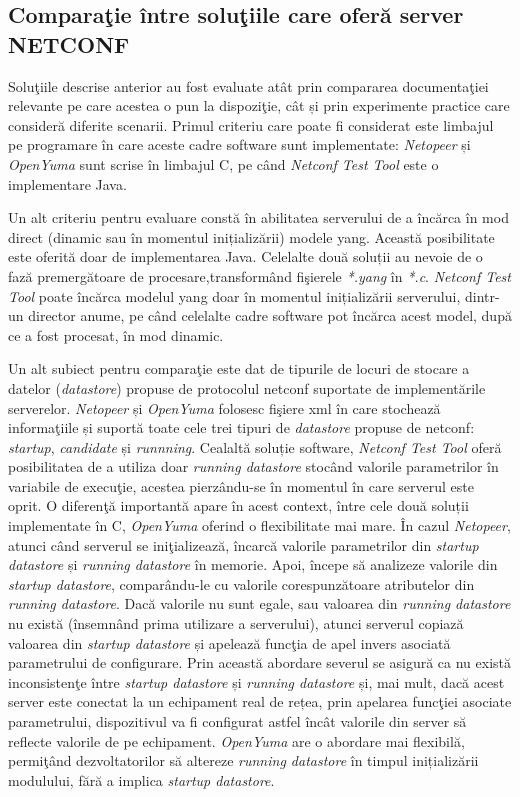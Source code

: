\subsection{Comparaţie între soluţiile care oferă server NETCONF}

Soluţiile descrise anterior au fost evaluate atât prin compararea documentaţiei relevante pe care acestea o pun la dispoziţie, cât și prin experimente practice care consideră diferite scenarii. Primul criteriu care poate fi considerat este limbajul pe programare în care aceste cadre software sunt implementate: \textit{Netopeer} și \textit{OpenYuma} sunt scrise în limbajul C, pe când \textit{Netconf Test Tool} este o implementare Java.

Un alt criteriu pentru evaluare constă în abilitatea serverului de a încărca în mod direct (dinamic sau în momentul inițializării) modele \gls{yang}. Această posibilitate este oferită doar de implementarea Java. Celelalte două soluții au nevoie de o fază premergătoare de procesare,transformând fişierele \textit{*.yang} în \textit{*.c}. \textit{Netconf Test Tool} poate încărca modelul \gls{yang} doar în momentul inițializării serverului, dintr-un director anume, pe când celelalte cadre software pot încărca acest model, după ce a fost procesat, în mod dinamic.

Un alt subiect pentru comparaţie este dat de tipurile de locuri de stocare a datelor (\textit{datastore}) propuse de protocolul \gls{netconf} suportate de implementările serverelor. \textit{Netopeer} și \textit{OpenYuma} folosesc fişiere \gls{xml} în care stochează informaţiile și suportă toate cele trei tipuri de \textit{datastore} propuse de \gls{netconf}: \textit{startup}, \textit{candidate} și \textit{runnning}. Cealaltă soluție software, \textit{Netconf Test Tool} oferă posibilitatea de a utiliza doar \textit{running datastore} stocând valorile parametrilor în variabile de execuţie, acestea pierzându-se în momentul în care serverul este oprit. O diferenţă importantă apare în acest context, între cele două soluții implementate în C, \textit{OpenYuma} oferind o flexibilitate mai mare. În cazul \textit{Netopeer}, atunci când serverul se iniţializează, încarcă valorile parametrilor din \textit{startup datastore} și \textit{running datastore} în memorie. Apoi, începe să analizeze valorile din \textit{startup datastore}, comparându-le cu valorile corespunzătoare atributelor din \textit{running datastore}. Dacă valorile nu sunt egale, sau valoarea din \textit{running datastore} nu există (însemnând prima utilizare a serverului), atunci serverul copiază valoarea din \textit{startup datastore} și apelează funcţia de apel invers asociată parametrului de configurare. Prin această abordare severul se asigură ca nu există inconsistenţe între \textit{startup datastore} și \textit{running datastore} și, mai mult, dacă acest server este conectat la un echipament real de rețea, prin apelarea funcţiei asociate parametrului, dispozitivul va fi configurat astfel încât valorile din server să reflecte valorile de pe echipament. \textit{OpenYuma} are o abordare mai flexibilă, permiţând dezvoltatorilor să altereze \textit{running datastore} în timpul inițializării modulului, fără a implica \textit{startup datastore}.

